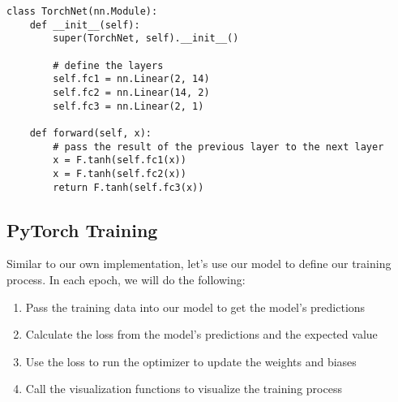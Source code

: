 \documentclass[openany]{book}
\providecommand{\tightlist}{%
      \setlength{\itemsep}{0pt}\setlength{\parskip}{0pt}}
\begin{document}
\begin{tcolorbox}
\tiny
\begin{verbatim}
class TorchNet(nn.Module):
    def __init__(self):
        super(TorchNet, self).__init__()

        # define the layers
        self.fc1 = nn.Linear(2, 14)
        self.fc2 = nn.Linear(14, 2)
        self.fc3 = nn.Linear(2, 1)

    def forward(self, x):
        # pass the result of the previous layer to the next layer
        x = F.tanh(self.fc1(x))
        x = F.tanh(self.fc2(x))
        return F.tanh(self.fc3(x))
\end{verbatim}
\end{tcolorbox}

    \subsection{PyTorch Training}\label{pytorch-training}

Similar to our own implementation, let's use our model to define our
training process. In each epoch, we will do the following:

\begin{enumerate}
\def\labelenumi{\arabic{enumi}.}
\tightlist
\item
  Pass the training data into our model to get the model's predictions
\item
  Calculate the loss from the model's predictions and the expected value
\item
  Use the loss to run the optimizer to update the weights and biases
\item
  Call the visualization functions to visualize the training process
\end{enumerate}
\end{document}
